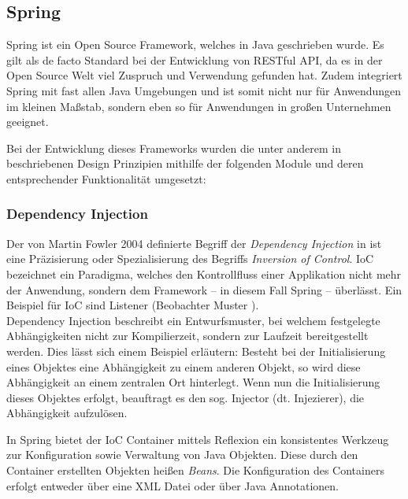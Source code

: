 		\subsection{Spring} %
		\label{sec:spring}
		
			Spring ist ein Open Source Framework, welches in Java geschrieben wurde. Es gilt als de facto Standard bei der Entwicklung von RESTful API, da es in der Open Source Welt viel Zuspruch und Verwendung gefunden hat. Zudem integriert Spring mit fast allen Java Umgebungen und ist somit nicht nur für Anwendungen im kleinen Maßstab, sondern eben so für Anwendungen in großen Unternehmen geeignet. \cite{Walls.20162017} 
			
			Bei der Entwicklung dieses Frameworks wurden die unter anderem in \cite{Johnson.2003} beschriebenen Design Prinzipien mithilfe der folgenden Module und deren entsprechender Funktionalität umgesetzt:
			
			\subsubsection{Dependency Injection} %
			
				Der von Martin Fowler 2004 definierte Begriff der \textit{Dependency Injection} in \cite{Fowler.23.01.2020} ist eine Präzisierung oder Spezialisierung des Begriffs \textit{Inversion of Control}. \acs{IoC} bezeichnet ein Paradigma, welches den Kontrollfluss einer Applikation nicht mehr der Anwendung, sondern dem Framework -- in diesem Fall Spring -- überlässt. Ein Beispiel für \acs{IoC} sind Listener (Beobachter Muster \cite{Gamma.1995}). \\
				Dependency Injection beschreibt ein Entwurfsmuster, bei welchem festgelegte Abhängigkeiten nicht zur Kompilierzeit, sondern zur Laufzeit bereitgestellt werden. Dies lässt sich einem Beispiel erläutern: Besteht bei der Initialisierung eines Objektes eine Abhängigkeit zu einem anderen Objekt, so wird diese Abhängigkeit an einem zentralen Ort hinterlegt. Wenn nun die Initialisierung dieses Objektes erfolgt, beauftragt es den sog. Injector (dt. Injezierer), die Abhängigkeit aufzulösen. \cite{Fowler.23.01.2020}
				
				In Spring bietet der \acs{IoC} Container mittels Reflexion ein konsistentes Werkzeug zur Konfiguration sowie Verwaltung von Java Objekten. Diese durch den Container erstellten Objekten heißen \textit{Beans}. Die Konfiguration des Containers erfolgt entweder über eine \acs{XML} Datei oder über Java Annotationen. \cite{Walls.20162017} 
				

